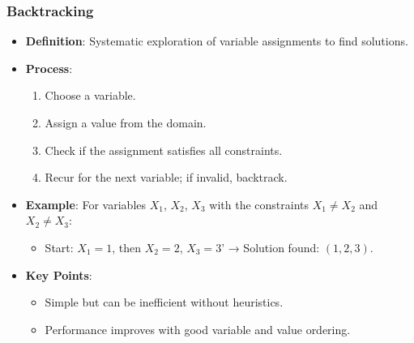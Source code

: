 \documentclass[aspectratio=169]{beamer}
\begin{document}
\begin{frame}[fragile]
    \frametitle{Backtracking}
    \begin{itemize}
        \item \textbf{Definition}: Systematic exploration of variable assignments to find solutions.
        \item \textbf{Process}:
        \begin{enumerate}
            \item Choose a variable.
            \item Assign a value from the domain.
            \item Check if the assignment satisfies all constraints.
            \item Recur for the next variable; if invalid, backtrack.
        \end{enumerate}
        \item \textbf{Example}: For variables \(X_1\), \(X_2\), \(X_3\) with the constraints \(X_1 \neq X_2\) and \(X_2 \neq X_3\):
        \begin{itemize}
            \item Start: \(X_1 = 1\), then \(X_2 = 2\), \(X_3 = 3\)' → Solution found: \((1, 2, 3)\).
        \end{itemize}
        \item \textbf{Key Points}:
        \begin{itemize}
            \item Simple but can be inefficient without heuristics.
            \item Performance improves with good variable and value ordering.
        \end{itemize}
    \end{itemize}
\end{frame}
\end{document}
